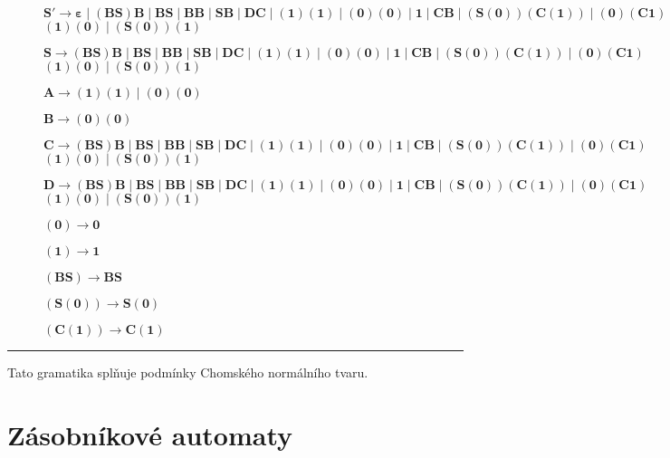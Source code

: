 \documentclass{report}
\begin{document}
\begin{description}
    \item[]$\mathbf{S' \rightarrow \varepsilon \mid (BS)B \mid BS \mid BB \mid SB \mid DC \mid  (1)(1) \mid (0)(0) \mid 1 \mid  CB \mid (S(0))(C(1)) \mid (0)(C1)}$\\$\mathbf{(1)(0) \mid (S(0))(1)}$
     \item[]$\mathbf{S \rightarrow (BS)B \mid BS \mid BB \mid SB \mid DC \mid  (1)(1) \mid (0)(0) \mid 1 \mid  CB \mid (S(0))(C(1)) \mid (0)(C1)}$\\$\mathbf{(1)(0) \mid (S(0))(1)}$
    \item[]$\mathbf{A \rightarrow (1)(1) \mid (0)(0)}$
    \item[]$\mathbf{B \rightarrow (0)(0)}$
   \item[]$\mathbf{C \rightarrow (BS)B \mid BS \mid BB \mid SB \mid DC \mid  (1)(1) \mid (0)(0) \mid 1 \mid  CB \mid (S(0))(C(1)) \mid (0)(C1)}$\\$\mathbf{(1)(0) \mid (S(0))(1)}$
    \item[]$\mathbf{D \rightarrow (BS)B \mid BS \mid BB \mid SB \mid DC \mid  (1)(1) \mid (0)(0) \mid 1 \mid  CB \mid (S(0))(C(1)) \mid (0)(C1)}$\\$\mathbf{(1)(0) \mid (S(0))(1)}$
    \item[]$\mathbf{(0) \rightarrow 0}$
    \item[]$\mathbf{(1) \rightarrow 1}$
    \item[]$\mathbf{(BS) \rightarrow BS}$
    \item[]$\mathbf{(S(0)) \rightarrow S(0)}$
    \item[]$\mathbf{(C(1)) \rightarrow C(1)}$
\end{description}
\vspace{0.1cm}    
\hrule
\vspace{0.4cm}
Tato gramatika splňuje podmínky Chomského normálního tvaru.
\setcounter{chapter}{5}
\setcounter{section}{0}
\chapter*{Zásobníkové automaty}
\end{document}
